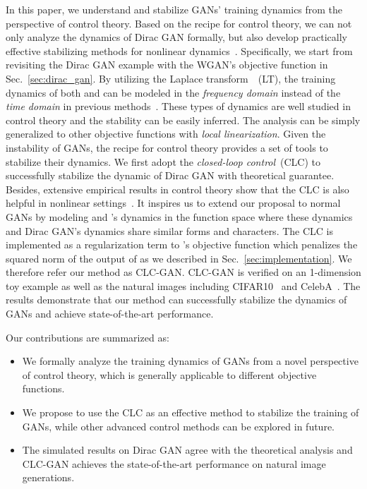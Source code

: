 \documentclass{article}
\newcommand{\secref}[1]{Sec.~\ref{sec:#1}} \usepackage{wrapfig}
\theoremstyle{definition}
\begin{document}
In this paper, we understand and stabilize GANs' training dynamics from the perspective of control theory.
Based on the recipe for control theory, we can not only analyze the dynamics of Dirac GAN formally, but also develop practically effective stabilizing methods for nonlinear dynamics~\cite{khalil2002nonlinear}.
Specifically, we start from revisiting the Dirac GAN example with the WGAN's objective function in \secref{dirac_gan}. By utilizing the Laplace transform~\cite{widder2015laplace}~(LT), the training dynamics of both  and  can be modeled in the {\it frequency domain} instead of the {\it time domain} in previous methods~\cite{mescheder2017numerics, mescheder2018training}.
These types of dynamics are well studied in control theory and the stability can be easily inferred. The analysis can be simply generalized to other objective functions with {\it local linearization}. Given the instability of GANs, the recipe for control theory provides a set of tools to stabilize their dynamics.
We first adopt the {\it closed-loop control}~(CLC) to successfully stabilize the dynamic of Dirac GAN with theoretical guarantee.
Besides, extensive empirical results in control theory show that the CLC is also helpful in nonlinear settings~\cite{khalil2002nonlinear}.
It inspires us to extend our proposal to normal GANs by modeling  and 's dynamics in the function space where these dynamics and Dirac GAN's dynamics share similar forms and characters.
The CLC is implemented as a regularization term to 's objective function which penalizes the squared  norm of the output of  as we described in \secref{implementation}.
We therefore refer our method as CLC-GAN.
CLC-GAN is verified on an 1-dimension toy example as well as the natural images including CIFAR10~\citep{krizhevsky2009learning} and CelebA~\citep{liu2015faceattributes}. The results demonstrate that our method can successfully stabilize the dynamics of GANs and achieve state-of-the-art performance.


Our contributions are summarized as:
\begin{itemize}
\setlength\itemsep{-2pt}
	\item We formally analyze the training dynamics of GANs from a novel perspective of control theory, which is generally applicable to different objective functions.
	\item We propose to use the CLC as an effective method to stabilize the training of GANs, while other advanced control methods can be explored in future. \item The simulated results on Dirac GAN agree with the theoretical analysis and CLC-GAN achieves the state-of-the-art performance on natural image generations.
\end{itemize}
\end{document}
